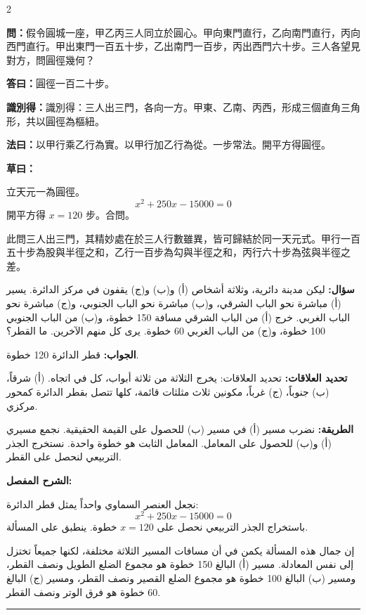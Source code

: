\documentclass[11pt,a4paper]{article}
\newcommand{\ar}[1]{\arabicfont\beginR #1\endR}
\newcommand{\arb}[1]{\textbf{\arabicfont\beginR #1\endR}}
\newcommand{\longline}{\noindent\rule{\textwidth}{0.4pt}}
\newcommand{\arnote}[1]{\textcolor{arabicblue}{\ar{#1}}}
\newcommand{\wen}[1]{\par\noindent\textbf{\textcolor{probcolor}{問：}}{#1}\par}
\newcommand{\da}[1]{\par\noindent\textbf{\textcolor{anscolor}{答曰：}}{#1}\par}
\newcommand{\fayue}[1]{\par\noindent\textbf{\textcolor{methodcolor}{法曰：}}{#1}\par}
\newcommand{\caoyue}[1]{\par\noindent\textbf{草曰：}{#1}\par}
\newcommand{\zhi}[1]{\par\noindent\textbf{識別得：}{#1}\par}
\newcommand{\arwen}[1]{\par\noindent\arb{سؤال: }\arnote{#1}\par}
\newcommand{\arjwb}[1]{\par\noindent\arb{الجواب: }\arnote{#1}\par}
\newcommand{\arqwd}[1]{\par\noindent\arb{الطريقة: }\arnote{#1}\par}
\newcommand{\arshr}[1]{\par\noindent\arb{الشرح المفصل: }\arnote{#1}\par}
\newcommand{\arfl}[1]{\par\noindent\arb{تحديد العلاقات: }\arnote{#1}\par}
\begin{document}
\begin{paracol}{2}

\begin{leftcolumn}
\wen{假令圓城一座，甲乙丙三人同立於圓心。甲向東門直行，乙向南門直行，丙向西門直行。甲出東門一百五十步，乙出南門一百步，丙出西門六十步。三人各望見對方，問圓徑幾何？}

\da{圓徑一百二十步。}

\zhi{識別得：三人出三門，各向一方。甲東、乙南、丙西，形成三個直角三角形，共以圓徑為樞紐。}

\fayue{以甲行乘乙行為實。以甲行加乙行為從。一步常法。開平方得圓徑。}

\caoyue{
立天元一為圓徑。
$$x^2 + 250x - 15000 = 0$$
開平方得 $x = 120$ 步。合問。

此問三人出三門，其精妙處在於三人行數雖異，皆可歸結於同一天元式。甲行一百五十步為股與半徑之和，乙行一百步為勾與半徑之和，丙行六十步為弦與半徑之差。}
\end{leftcolumn}

\begin{rightcolumn}
\arwen{ليكن مدينة دائرية، وثلاثة أشخاص (أ) و(ب) و(ج) يقفون في مركز الدائرة. يسير (أ) مباشرة نحو الباب الشرقي، و(ب) مباشرة نحو الباب الجنوبي، و(ج) مباشرة نحو الباب الغربي. خرج (أ) من الباب الشرقي مسافة 150 خطوة، و(ب) من الباب الجنوبي 100 خطوة، و(ج) من الباب الغربي 60 خطوة. يرى كل منهم الآخرين. ما القطر؟}

\arjwb{قطر الدائرة 120 خطوة.}

\arfl{تحديد العلاقات: يخرج الثلاثة من ثلاثة أبواب، كل في اتجاه. (أ) شرقاً، (ب) جنوباً، (ج) غرباً، مكونين ثلاث مثلثات قائمة، كلها تتصل بقطر الدائرة كمحور مركزي.}

\arqwd{نضرب مسير (أ) في مسير (ب) للحصول على القيمة الحقيقية. نجمع مسيري (أ) و(ب) للحصول على المعامل. المعامل الثابت هو خطوة واحدة. نستخرج الجذر التربيعي لنحصل على القطر.}

\arshr{نجعل العنصر السماوي واحداً يمثل قطر الدائرة:
$$x^2 + 250x - 15000 = 0$$
باستخراج الجذر التربيعي نحصل على $x = 120$ خطوة. ينطبق على المسألة.

إن جمال هذه المسألة يكمن في أن مسافات المسير الثلاثة مختلفة، لكنها جميعاً تختزل إلى نفس المعادلة. مسير (أ) البالغ 150 خطوة هو مجموع الضلع الطويل ونصف القطر، ومسير (ب) البالغ 100 خطوة هو مجموع الضلع القصير ونصف القطر، ومسير (ج) البالغ 60 خطوة هو فرق الوتر ونصف القطر.}
\end{rightcolumn}

\end{paracol}

\vspace{0.3cm}
\longline
\end{document}
